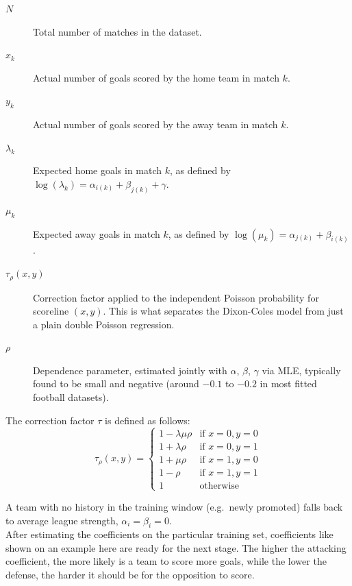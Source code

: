 \documentclass{article}
\begin{document}
\begin{description}
    \item[$N$] Total number of matches in the dataset.
    \item[$x_k$] Actual number of goals scored by the home team in match $k$.
    \item[$y_k$] Actual number of goals scored by the away team in match $k$.
    \item[$\lambda_k$] Expected home goals in match $k$, as defined by $\log(\lambda_k) = \alpha_{i(k)} + \beta_{j(k)} + \gamma$.
    \item[$\mu_k$] Expected away goals in match $k$, as defined by $\log(\mu_k) = \alpha_{j(k)} + \beta_{i(k)}$.
    \item[$\tau_{\rho}(x,y)$] Correction factor applied to the independent Poisson probability for scoreline $(x,y)$. This is what separates the Dixon-Coles model from just a plain double Poisson regression.
    \item[$\rho$] Dependence parameter, estimated jointly with $\alpha$, $\beta$, $\gamma$ via MLE, typically found to be small and negative (around $-0.1$ to $-0.2$ in most fitted football datasets).
\end{description}

The correction factor $\tau$ is defined as follows:
\begin{equation}
\tau_{\rho}(x, y) =
\begin{cases}
1 - \lambda\mu\rho & \text{if } x=0, y=0 \\
1 + \lambda\rho & \text{if } x=0, y=1 \\
1 + \mu\rho & \text{if } x=1, y=0 \\
1 - \rho & \text{if } x=1, y=1 \\
1 & \text{otherwise}
\end{cases}
\end{equation}


A team with no history in the training window (e.g.\ newly promoted) falls
back to average league strength, $\alpha_i = \beta_i = 0$.
\\
After estimating the coefficients on the particular training set, coefficients like shown on an example here are ready for the next stage. The higher the attacking coefficient, the more likely is a team to score more goals, while the lower the defense, the harder it should be for the opposition to score.
\end{document}
